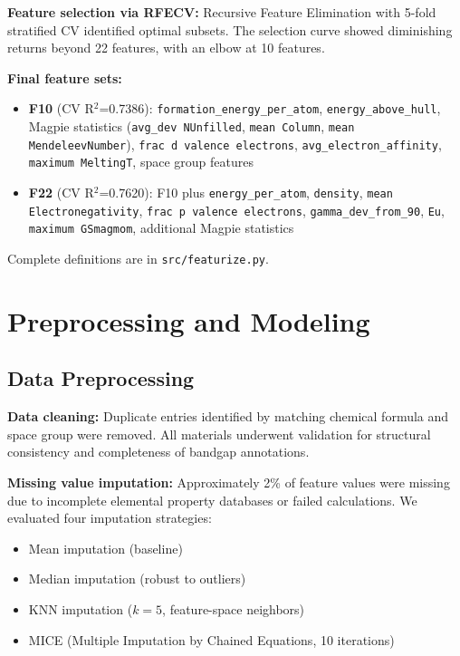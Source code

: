 \documentclass[conference]{IEEEtran}
\begin{document}
\textbf{Feature selection via RFECV:} Recursive Feature Elimination with 5-fold stratified CV identified optimal subsets. The selection curve showed diminishing returns beyond 22 features, with an elbow at 10 features.

\textbf{Final feature sets:}
\begin{itemize}
  \item \textbf{F10} (CV R$^2$=0.7386): \texttt{formation\_energy\_per\_atom}, \texttt{energy\_above\_hull}, Magpie statistics (\texttt{avg\_dev NUnfilled}, \texttt{mean Column}, \texttt{mean MendeleevNumber}), \texttt{frac d valence electrons}, \texttt{avg\_electron\_affinity}, \texttt{maximum MeltingT}, space group features
  \item \textbf{F22} (CV R$^2$=0.7620): F10 plus \texttt{energy\_per\_atom}, \texttt{density}, \texttt{mean Electronegativity}, \texttt{frac p valence electrons}, \texttt{gamma\_dev\_from\_90}, \texttt{Eu}, \texttt{maximum GSmagmom}, additional Magpie statistics
\end{itemize}

Complete definitions are in \texttt{src/featurize.py}.

\section{Preprocessing and Modeling}

\subsection{Data Preprocessing}
\textbf{Data cleaning:} Duplicate entries identified by matching chemical formula and space group were removed. All materials underwent validation for structural consistency and completeness of bandgap annotations.

\textbf{Missing value imputation:} Approximately 2\% of feature values were missing due to incomplete elemental property databases or failed calculations. We evaluated four imputation strategies:
\begin{itemize}
  \item Mean imputation (baseline)
  \item Median imputation (robust to outliers)
  \item KNN imputation ($k=5$, feature-space neighbors)
  \item MICE (Multiple Imputation by Chained Equations, 10 iterations)
\end{itemize}
\end{document}
